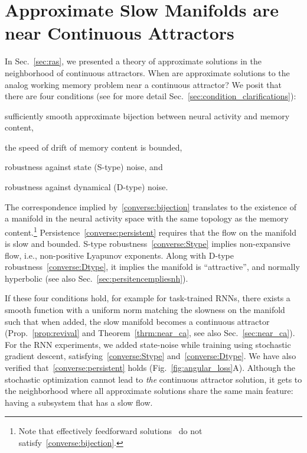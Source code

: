 \documentclass{article} %
\newcounter{ct}
\theoremstyle{definition}
\theoremstyle{remark}
\begin{document}
\section{Approximate Slow Manifolds are near Continuous Attractors}\label{sec:converse}
In Sec.~\ref{sec:ras}, we presented a theory of approximate solutions in the neighborhood of continuous attractors.
When are approximate solutions to the analog working memory problem near a continuous attractor?
We posit that there are four conditions (see for more detail Sec.~\ref{sec:condition_clarifications}):
\begin{enumerate*}[label=\textbf{(C\arabic*)}]
\item sufficiently smooth approximate bijection between neural activity and memory content,\label{converse:bijection}
\item the speed of drift of memory content is bounded,\label{converse:persistent}
\item robustness against state (S-type) noise, and\label{converse:Stype}
\item robustness against dynamical (D-type) noise.\label{converse:Dtype}
\end{enumerate*}
The correspondence implied by~\ref{converse:bijection} translates to the existence of a manifold in the neural activity space with the same topology as the memory content.\footnote{Note that effectively feedforward solutions~\citep{Goldman2009} do not satisfy~\ref{converse:bijection}.}
Persistence~\ref{converse:persistent} requires that the flow on the manifold is slow and bounded.
S-type robustness~\ref{converse:Stype} implies non-expansive flow, i.e., non-positive Lyapunov exponents.
Along with D-type robustness~\ref{converse:Dtype}, it implies the manifold is ``attractive'', and normally hyperbolic (see also Sec.~\ref{sec:persitencempliesnh}).

If these four conditions hold, for example for task-trained RNNs, there exists a smooth function with a uniform norm matching the slowness on the manifold such that when added, the slow manifold becomes a continuous attractor (Prop.~\ref{prop:revival} and Theorem~\ref{thrm:near_ca}, see also Sec.~\ref{sec:near_ca}).
For the RNN experiments, we added state-noise while training using stochastic gradient descent, satisfying~\ref{converse:Stype} and~\ref{converse:Dtype}.
We have also verified that~\ref{converse:persistent} holds (Fig.~\ref{fig:angular_loss}A).
Although the stochastic optimization cannot lead to \emph{the} continuous attractor solution, it gets to the neighborhood where all approximate solutions share the same main feature: having a subsystem that has a slow flow.
\end{document}

